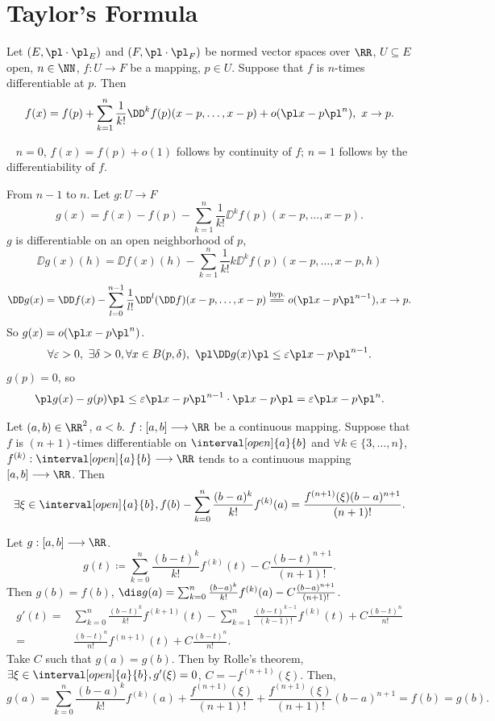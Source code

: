 \newpage
\section{Taylor's Formula}
\begin{theoremenv}
    Let $(E,\pl \cdot\pl_E)$ and $(F,\pl \cdot\pl_F)$ be normed vector spaces over $\RR$, $U\subseteq E$ open, $n\in \NN$, $f:U\longrightarrow F$ be a mapping, $p\in U$.
    Suppose that $f$ is $n$-times differentiable at $p$. Then
    $$ f(x)=f(p)+\sum_{k=1}^{n}\frac{1}{k!}\DD^{k} f(p)(x-p,\ldots,x-p)+o(\pl x-p\pl^n),\ x\rightarrow p.$$
\end{theoremenv}
\begin{proofenv}[By induction on $n$]
    \ \newline
    $n=0$, $f(x)=f(p)+o(1)$  follows by continuity of $f$; $n=1$ follows by the differentiability of $f$.

    \quad From $n-1$ to $n$. Let $g:U\longrightarrow F$
    $$g(x)=f(x)-f(p)-\sum_{k=1}^{n}\frac{1}{k!}\DD^k f(p)(x-p,\ldots,x-p).$$
    $g$ is differentiable on an open neighborhood of $p$,
    {$$\DD g(x)(h) =\DD f(x)(h)-\sum_{k=1}^{n}\frac{1}{k!}k \DD^{k}f(p)(x-p,\ldots,x-p,h)$$}
    $$\DD g(x)=\DD f(x)-\sum_{l=0}^{n-1}\frac{1}{l!}\DD^l(\DD f)(x-p,\ldots,x-p)\overset{\text{hyp.}}{=\! =}o(\pl x-p\pl^{n-1}), x\rightarrow p.$$
    So $g(x)=o(\pl x-p\pl^n)$.
    $$ \forall \varepsilon>0,\ \exists\delta>0,\forall x\in B(p,\delta),\ \pl \DD g(x)\pl\le \varepsilon\pl x-p\pl^{n-1}.$$
    $g(p)=0$, so
    $$\pl g(x)-g(p)\pl\le \varepsilon\pl x-p\pl ^{n-1}\cdot\pl x-p\pl = \varepsilon\pl x-p\pl ^n.$$
\end{proofenv}

\begin{theoremenv}
    Let $(a,b)\in \RR^2$, $a<b$. $f:[a,b]\longrightarrow \RR$ be a continuous mapping. Suppose that $f$ is $(n+1)$-times differentiable on $\interval[open]{a}{b}$ and $\forall k\in \{3,\ldots,n\}$, $f^{(k)}:\interval[open]{a}{b}\longrightarrow \RR$   tends to a continuous mapping $[a,b]\longrightarrow \RR$. Then
    $$\exists \xi\in \interval[open]{a}{b}, f(b)-\sum_{k=0}^{n}\frac{(b-a)^k}{k!}f^{(k)}(a)=\frac{f^{(n+1)}(\xi)(b-a)^{n+1}}{(n+1)!}.$$
\end{theoremenv}
\begin{proofenv}
    Let $g:[a,b]\longrightarrow \RR$.
    $$ g(t)\coloneq \sum_{k=0}^{n}\frac{(b-t)^k}{k!}f^{(k)}(t)-C\frac{(b-t)^{n+1}}{(n+1)!}.$$
    Then $g(b)=f(b)$, $\dis g(a)=\sum_{k=0}^{n}\frac{(b-a)^k}{k!}f^{(k)}(a)-C\frac{(b-a)^{n+1}}{(n+1)!}$.
    \begin{align*}
        g'(t)=&\sum_{k=0}^{n}\frac{(b-t)^k}{k!}f^{(k+1)}(t)-\sum_{k=1}^{n}\frac{(b-t)^{k-1}}{(k-1)!}f^{(k)}(t)+C\frac{(b-t)^n}{n!}\\
        =& \frac{(b-t)^n}{n!}f^{(n+1)}(t)+C\frac{(b-t)^n}{n!}.
    \end{align*}
    Take $C$ such that $g(a)=g(b)$. Then by Rolle's theorem,
    $\exists \xi\in \interval[open]{a}{b}, g'(\xi)=0$, $C=-f^{(n+1)}(\xi)$. Then,
    $$g(a)=\sum_{k=0}^{n}\frac{(b-a)^k}{k!}f^{(k)}(a)+\frac{f^{(n+1)}(\xi)}{(n+1)!}+\frac{f^{(n+1)}(\xi)}{(n+1)!}(b-a)^{n+1}=f(b)=g(b).$$
\end{proofenv}

